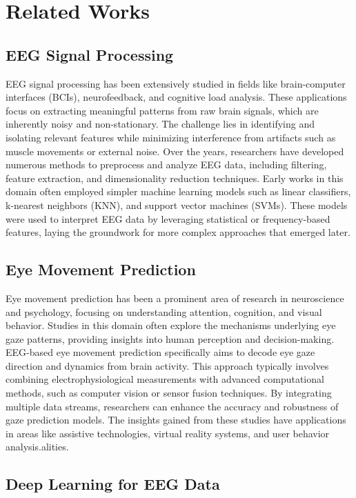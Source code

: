 \documentclass{article}
\begin{document}
\section {Related Works}

\subsection { EEG Signal Processing}

EEG signal processing has been extensively studied in fields like brain-computer interfaces (BCIs), neurofeedback, and cognitive load analysis. These applications focus on extracting meaningful patterns from raw brain signals, which are inherently noisy and non-stationary. The challenge lies in identifying and isolating relevant features while minimizing interference from artifacts such as muscle movements or external noise. Over the years, researchers have developed numerous methods to preprocess and analyze EEG data, including filtering, feature extraction, and dimensionality reduction techniques. Early works in this domain often employed simpler machine learning models such as linear classifiers, k-nearest neighbors (KNN), and support vector machines (SVMs). These models were used to interpret EEG data by leveraging statistical or frequency-based features, laying the groundwork for more complex approaches that emerged later.

\subsection {Eye Movement Prediction}

Eye movement prediction has been a prominent area of research in neuroscience and psychology, focusing on understanding attention, cognition, and visual behavior. Studies in this domain often explore the mechanisms underlying eye gaze patterns, providing insights into human perception and decision-making. EEG-based eye movement prediction specifically aims to decode eye gaze direction and dynamics from brain activity. This approach typically involves combining electrophysiological measurements with advanced computational methods, such as computer vision or sensor fusion techniques. By integrating multiple data streams, researchers can enhance the accuracy and robustness of gaze prediction models. The insights gained from these studies have applications in areas like assistive technologies, virtual reality systems, and user behavior analysis.alities. 

\subsection{Deep Learning for EEG Data}
\end{document}
